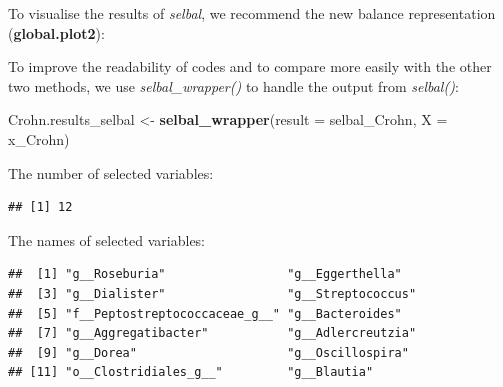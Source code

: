 \documentclass[openany]{book}
\newenvironment{Shaded}{\begin{snugshade}}{\end{snugshade}}
\newcommand{\KeywordTok}[1]{\textcolor[rgb]{0.13,0.29,0.53}{\textbf{#1}}}
\newcommand{\DataTypeTok}[1]{\textcolor[rgb]{0.13,0.29,0.53}{#1}}
\newcommand{\StringTok}[1]{\textcolor[rgb]{0.31,0.60,0.02}{#1}}
\newcommand{\CommentTok}[1]{\textcolor[rgb]{0.56,0.35,0.01}{\textit{#1}}}
\newcommand{\OperatorTok}[1]{\textcolor[rgb]{0.81,0.36,0.00}{\textbf{#1}}}
\newcommand{\NormalTok}[1]{#1}
\begin{document}
To visualise the results of \emph{selbal}, we recommend the new balance
representation (\textbf{global.plot2}):

\begin{Shaded}
\end{Shaded}

To improve the readability of codes and to compare more easily with the
other two methods, we use \emph{selbal\_wrapper()} to handle the output
from \emph{selbal()}:

\begin{Shaded}
\begin{Highlighting}[]
\NormalTok{Crohn.results_selbal <-}\StringTok{ }\KeywordTok{selbal_wrapper}\NormalTok{(}\DataTypeTok{result =}\NormalTok{ selbal_Crohn, }\DataTypeTok{X =}\NormalTok{ x_Crohn) }
\end{Highlighting}
\end{Shaded}

The number of selected variables:

\begin{Shaded}
\end{Shaded}

\begin{verbatim}
## [1] 12
\end{verbatim}

The names of selected variables:

\begin{Shaded}
\end{Shaded}

\begin{verbatim}
##  [1] "g__Roseburia"                 "g__Eggerthella"              
##  [3] "g__Dialister"                 "g__Streptococcus"            
##  [5] "f__Peptostreptococcaceae_g__" "g__Bacteroides"              
##  [7] "g__Aggregatibacter"           "g__Adlercreutzia"            
##  [9] "g__Dorea"                     "g__Oscillospira"             
## [11] "o__Clostridiales_g__"         "g__Blautia"
\end{verbatim}
\end{document}
